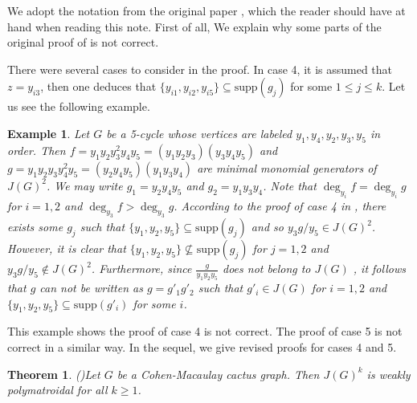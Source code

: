 \documentclass[sn-mathphys,Numbered]{sn-jnl}%
\theoremstyle{thmstyleone}%
\newtheorem{theorem}{Theorem}%
\theoremstyle{thmstyletwo}%
\newtheorem{example}{Example}%
\theoremstyle{thmstylethree}%
\begin{document}
We adopt the notation from the original paper \cite{M}, which  the reader should have  at  hand when  reading this  note. First of all, We   explain why some parts of the original proof of \cite[Theorem 4.3]{M} is not correct.

There were  several cases to consider in the proof. In case 4,   it is assumed that $z=y_{i3}$, then one deduces that $\{y_{i1}, y_{i2}, y_{i5}\}\subseteq \mathrm{supp}(g_j)$ for some $1\leq j\leq k$. Let us see the following example.
\vspace{2mm}

\begin{example} \em Let $G$  be a 5-cycle whose vertices are labeled $y_1,y_4,y_2,y_3,y_5$ in order. Then $f=y_1y_2y_3^2y_4y_5=(y_1y_2y_3)(y_3y_4y_5)$ and $g=y_1y_2y_3y_4^2y_5=( y_2y_4y_5)(y_1y_3y_4)$ are  minimal monomial generators of $J(G)^2$. We may write $g_1=y_2y_4y_5$ and $g_2=y_1y_3y_4$. Note that $\deg_{y_i}f=\deg_{y_i}g$ for $i=1,2$ and $\deg_{y_3}f>\deg_{y_3}g$. According to the proof of case 4 in \cite{M}, there exists some $g_j$ such that $\{y_{1}, y_{2}, y_{5}\}\subseteq \mathrm{supp}(g_j)$ and  so $y_3g/y_5\in J(G)^2$.   However, it is clear that $\{y_{1}, y_{2}, y_{5}\}\nsubseteq \mathrm{supp}(g_j)$ for $j=1,2$ and $y_3g/y_5\notin J(G)^2$. Furthermore, since $\frac{g}{y_1y_2y_5}$ does not belong to  $J(G)$ , it follows that $g$ can not be written as  $g=g'_1g'_2$  such that $g'_i\in J(G)$  for $i=1,2$ and $\{y_{1}, y_{2}, y_{5}\}\subseteq \mathrm{supp}(g'_i)$ for some $i$.
\end{example}
\vspace{2mm}

This example shows the proof of case 4 is not correct. The proof of case 5 is not correct in a similar way. In the sequel, we give  revised proofs for cases 4 and 5.


\vspace{2mm}
\begin{theorem}\label{thm1} {\em(\cite[Theorem 4.3]{M})}\quad   Let $G$ be a Cohen-Macaulay cactus graph. Then $J(G)^k$ is weakly polymatroidal for all $k\geq 1$.
\end{theorem}
\end{document}
